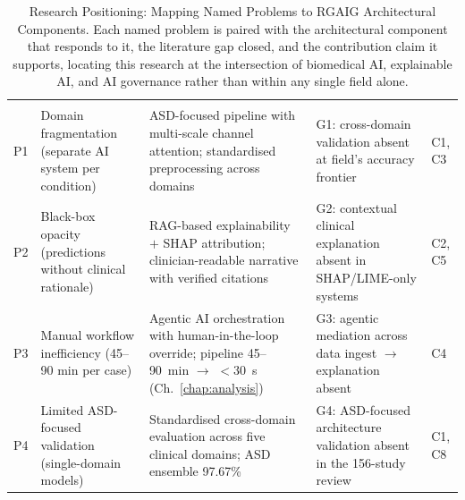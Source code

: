 {\tablestripes\tablefontsize
\begin{xltabular}{\textwidth}{@{} >{\centering\arraybackslash}p{0.6cm} L L >{\raggedright\arraybackslash}p{2.6cm} >{\raggedright\arraybackslash}p{1.4cm} @{}}
\caption[Research Positioning: Mapping Named Problems to RGAIG]{Research Positioning: Mapping Named Problems to RGAIG Architectural Components. Each named problem is paired with the architectural component that responds to it, the literature gap closed, and the contribution claim it supports, locating this research at the intersection of biomedical AI, explainable AI, and AI governance rather than within any single field alone.}\label{tab:research_positioning} \\
\toprule
{} &  &  &  &  \\
\midrule
\endfirsthead
\toprule
{} &  &  &  &  \\
\midrule
\endhead
\bottomrule
\endlastfoot
P1 & Domain fragmentation (separate AI system per condition) & ASD-focused pipeline with multi-scale channel attention; standardised preprocessing across domains & G1: cross-domain validation absent at field's accuracy frontier & C1, C3 \\
\addlinespace
P2 & Black-box opacity (predictions without clinical rationale) & RAG-based explainability $+$ SHAP attribution; clinician-readable narrative with verified citations & G2: contextual clinical explanation absent in SHAP/LIME-only systems & C2, C5 \\
\addlinespace
P3 & Manual workflow inefficiency (45--90 min per case) & Agentic AI orchestration with human-in-the-loop override; pipeline 45--90~min $\to$ $<$30~s (Ch.~\ref{chap:analysis}) & G3: agentic mediation across data ingest $\to$ explanation absent & C4 \\
\addlinespace
P4 & Limited ASD-focused validation (single-domain models) & Standardised cross-domain evaluation across five clinical domains; ASD ensemble 97.67\% & G4: ASD-focused architecture validation absent in the 156-study review & C1, C8 \\
\end{xltabular}}

